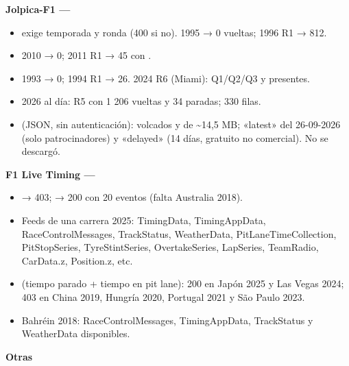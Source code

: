 \textbf{Jolpica-F1 — }

\begin{itemize}
\item {} exige temporada y ronda (400 si no). 1995 → 0 vueltas; 1996 R1 → 812.
\item {} 2010 → 0; 2011 R1 → 45 con .
\item {} 1993 → 0; 1994 R1 → 26. 2024 R6 (Miami): Q1/Q2/Q3 y  presentes.
\item 2026 al día: R5 con 1 206 vueltas y 34 paradas;  330 filas.
\item {} (JSON, sin autenticación): volcados  y  de \textasciitilde{}14,5 MB; «latest» del 26-09-2026 (solo patrocinadores) y «delayed» (14 días, gratuito no comercial). No se descargó.
\end{itemize}

\textbf{F1 Live Timing — }

\begin{itemize}
\item {} → 403;  → 200 con 20 eventos (falta Australia 2018).
\item Feeds de una carrera 2025: TimingData, TimingAppData, RaceControlMessages, TrackStatus, WeatherData, PitLaneTimeCollection, PitStopSeries, TyreStintSeries, OvertakeSeries, LapSeries, TeamRadio, CarData.z, Position.z, etc.
\item {} (tiempo parado + tiempo en pit lane): 200 en Japón 2025 y Las Vegas 2024; 403 en China 2019, Hungría 2020, Portugal 2021 y São Paulo 2023.
\item Bahréin 2018: RaceControlMessages, TimingAppData, TrackStatus y WeatherData disponibles.
\end{itemize}

\textbf{Otras}

